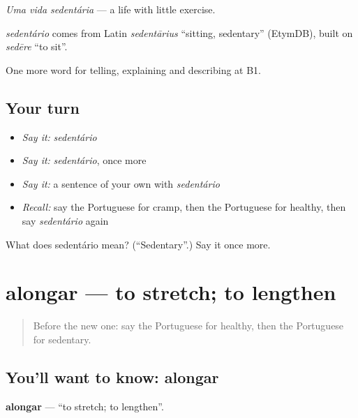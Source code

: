 \emph{Uma vida sedentária} — a life with little exercise.

\begin{cousinweb}
\emph{sedentário} comes from Latin \emph{sedentārius} \textquotedblleft{}sitting, sedentary\textquotedblright{} (EtymDB), built on \emph{sedēre} \textquotedblleft{}to sit\textquotedblright{}.
\end{cousinweb}

\begin{grammarlens}[title={What you've built}]
One more word for telling, explaining and describing at B1.
\end{grammarlens}

\subsection*{Your turn}
\begin{itemize}
\raggedright
  \item \emph{Say it:} \emph{sedentário}
  \item \emph{Say it:} \emph{sedentário}, once more
  \item \emph{Say it:} a sentence of your own with \emph{sedentário}
  \item \emph{Recall:} say the Portuguese for cramp, then the Portuguese for healthy, then say \emph{sedentário} again
\end{itemize}

\begin{tcolorbox}[breakable,colback=teal!4,colframe=teal!35!black,title={Before you move on}]
What does sedentário mean? (\textquotedblleft{}Sedentary\textquotedblright{}.) Say it once more.
\end{tcolorbox}
\section[alongar]{alongar — to stretch; to lengthen}

\label{lesson:PT-C490-alongar}



\begin{quote}
Before the new one: say the Portuguese for healthy, then the Portuguese for sedentary.
\end{quote}

\subsection*{You'll want to know: alongar}
\textbf{alongar} — \textquotedblleft{}to stretch; to lengthen\textquotedblright{}.

